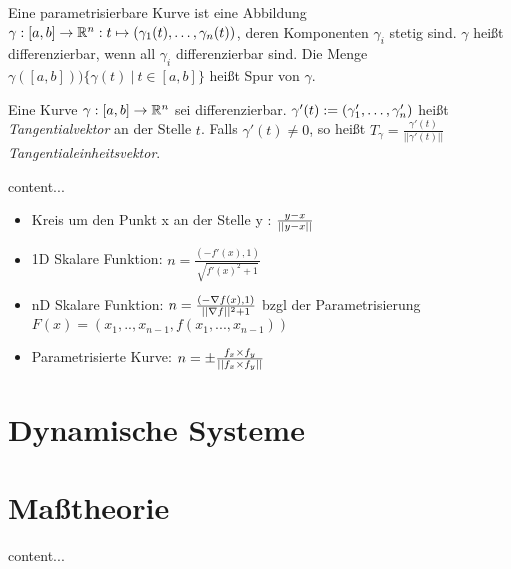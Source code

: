 \begin{definition}
	Eine parametrisierbare Kurve ist eine Abbildung $\gamma : [a, b] \rightarrow \mathbb{R}^n : t \mapsto (\gamma_1(t), \dots, \gamma_n(t))$, deren Komponenten $\gamma_i$ stetig sind. $\gamma$ heißt differenzierbar, wenn all $\gamma_i$ differenzierbar sind. Die Menge $\gamma([a,b]) ) \{\gamma(t) \medspace | \medspace t \in [a,b] \}$ heißt Spur von $\gamma$.
\end{definition}

\begin{definition}[Tangentialvektor]
	Eine Kurve $\gamma : [a,b] \rightarrow \mathbb{R}^n$ sei differenzierbar. $\gamma'(t) := (\gamma'_1, \dots, \gamma'_n)$ heißt \emph{Tangentialvektor} an der Stelle $t$. Falls $\gamma'(t) \neq 0$, so heißt $T_\gamma = \frac{\gamma'(t)}{||\gamma'(t)||}$ \emph{Tangentialeinheitsvektor}.
\end{definition}

\begin{definition}[Normalenvektor]
	content...
\end{definition}


\begin{satz}
	\begin{itemize}[noitemsep]
		\item Kreis um den Punkt x an der Stelle y : $\frac{y - x}{||y - x||}$
		\item 1D Skalare Funktion: $n = \frac{(-f'(x), 1)}{\sqrt{f'(x)^2 + 1}}$
		\item nD Skalare Funktion: $n = \frac{(-\nabla f(x), 1)}{ ||\nabla f||^2 + 1}$ bzgl der Parametrisierung 
		 $F(x) = (x_1, .., x_{n-1}, f(x_1, ..., x_{n-1}))$	
		\item Parametrisierte Kurve: $n = \pm \frac{f_x \times f_y}{||f_x \times f_y||}$
	\end{itemize}
\end{satz}

\pagebreak



\section{Dynamische Systeme}

\pagebreak

\section{Maßtheorie}

\begin{definition}
	content...
\end{definition}